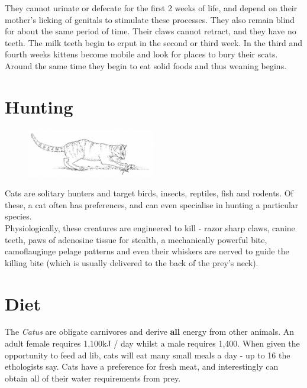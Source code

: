 \documentclass{article}
\begin{document}
They cannot urinate or defecate for the first 2 weeks of life, and depend on their mother's licking of genitals to stimulate these processes. They also remain blind for about the same period of time. Their claws cannot retract, and they have no teeth. The milk teeth begin to erput in the second or third week. In the third and fourth weeks kittens become mobile and look for places to bury their scats. Around the same time they begin to eat solid foods and thus weaning begins.

\section*{Hunting}

\begin{figure}[h]
    \centering
    \includegraphics[width=0.5\textwidth]{img/cat-hunter.png}
\end{figure}

\noindent{}Cats are solitary hunters and target birds, insects, reptiles, fish and rodents. Of these, a cat often has preferences, and can even specialise in hunting a particular species.\\

Physiologically, these creatures are engineered to kill - razor sharp claws, canine teeth, paws of adenosine tissue for stealth, a mechanically powerful bite, camoflauginge \gls{pelage} patterns and even their whiskers are nerved to guide the killing bite (which is usually delivered to the back of the prey's neck).


\section*{Diet}
The \emph{Catus} are obligate carnivores and derive \textbf{all} energy from other animals. An adult female requires 1,100kJ / day whilst a male requires 1,400. When given the opportunity to feed ad lib, cats will eat many small meals a day - up to 16 the ethologists say. Cats have a preference for fresh meat, and interestingly can obtain all of their water requirements from prey. 
\end{document}
